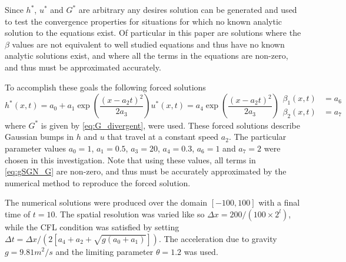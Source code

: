 \documentclass[10pt]{elsarticle}
\begin{document}
Since $h^*$, $u^*$ and $G^*$ are arbitrary any desires solution can be generated and used to test the convergence properties for situations for which no known analytic solution to the equations exist. Of particular in this paper are solutions where the $\beta$ values are not equivalent to well studied equations and thus have no known analytic solutions exist, and where all the terms in the equations are non-zero, and thus must be approximated accurately. 

To accomplish these goals the following forced solutions
\begin{subequations}
	\begin{equation}
	h^*(x,t) = a_0 + a_1 \exp\left( \dfrac{\left(x - a_2 t\right)^2}{2 a_3} \right)
	\end{equation}
	\begin{equation}
	u^*(x,t) = a_4 \exp\left( \dfrac{\left(x - a_2 t\right)^2}{2 a_3} \right)
	\end{equation}
	\begin{align}
	\beta_1(x,t) &= a_6 \\
	\beta_2(x,t) &= a_7
	\end{align}
\end{subequations}
where $G^*$ is given by \eqref{eq:G_divergent}, were used. These forced solutions describe Gaussian bumps in $h$ and $u$ that travel at a constant speed $a_2$. The particular parameter values $a_0=1$, $a_1=0.5$, $a_3=20$, $a_4=0.3$, $a_6 = 1$ and $a_7=2$ were chosen in this investigation. Note that using these values, all terms in \eqref{eq:gSGN_G} are non-zero, and thus must be accurately approximated by the numerical method to reproduce the forced solution.

The numerical solutions were produced over the domain $\left[-100,100\right]$ with a final time of $t=10$. The spatial resolution was varied like so $\Delta x = 200 / (100 \times 2^{l})$, while the CFL condition was satisfied by setting $\Delta t = \Delta x  / \left( 2 \left[a_4 + a_2+ \sqrt{g \left(a_0 + a_1\right)}\right] \right)$. The acceleration due to gravity $g=9.81m^2/s$ and the limiting parameter $\theta = 1.2$ was used.
\end{document}
